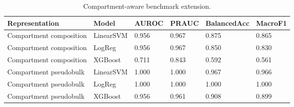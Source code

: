 \begin{table}
\caption{Compartment-aware benchmark extension.}
\begin{tabular}{llllll}
\toprule
Representation & Model & AUROC & PRAUC & BalancedAcc & MacroF1 \\
\midrule
Compartment composition & LinearSVM & 0.956 & 0.967 & 0.875 & 0.865 \\
Compartment composition & LogReg & 0.956 & 0.967 & 0.850 & 0.830 \\
Compartment composition & XGBoost & 0.711 & 0.843 & 0.592 & 0.561 \\
Compartment pseudobulk & LinearSVM & 1.000 & 1.000 & 0.967 & 0.966 \\
Compartment pseudobulk & LogReg & 1.000 & 1.000 & 1.000 & 1.000 \\
Compartment pseudobulk & XGBoost & 0.956 & 0.961 & 0.908 & 0.899 \\
\bottomrule
\end{tabular}
\end{table}
